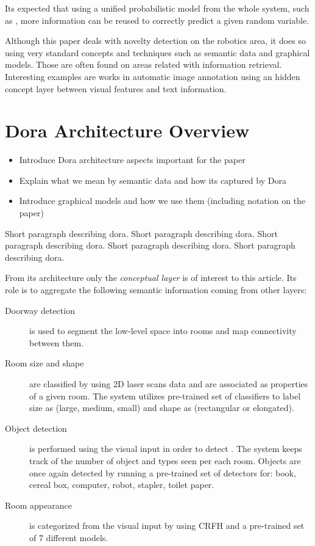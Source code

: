 \documentclass[runningheads,a4paper]{llncs}
\begin{document}
Its expected that using a unified probabilistic model from the whole system, such as \cite{pronobis2011exploiting}, more information can be reused to correctly predict a given random variable.

Although this paper deals with novelty detection on the robotics area, it does so using very
standard concepts and techniques such as semantic data and graphical models.
Those are often found on areas related with information retrieval.
Interesting examples are works in automatic image annotation using an hidden concept layer between visual features and text information\cite{zhang2005probabilistic}.

\section{Dora Architecture Overview}
\begin{itemize}
\item Introduce Dora architecture aspects important for the paper
\item Explain what we mean by semantic data and how its captured by Dora
\item Introduce graphical models and how we use them (including notation on the paper)
\end{itemize}

Short paragraph describing dora. Short paragraph describing dora. Short paragraph describing dora. Short paragraph describing dora. Short paragraph describing dora.

From its architecture only the \emph{conceptual layer} is of interest to this article.
Its role is to aggregate the following semantic information coming from other layers:

\begin{description}
 \item[Doorway detection] is used to segment the low-level space into rooms and map connectivity between them.
 \item[Room size and shape] are classified by using 2D laser scans data and are associated as properties of a given room. The system utilizes pre-trained set of classifiers to label size as (large, medium, small) and shape as (rectangular or elongated).
 \item[Object detection] is performed using the visual input in order to detect . The system keeps track of the number of object and types seen per each room. Objects are once again detected by running a pre-trained set of detectors for: book, cereal box, computer, robot, stapler, toilet paper.
 \item[Room appearance] is categorized from the visual input by using CRFH and a pre-trained set of 7 different models.
\end{description}
\end{document}
